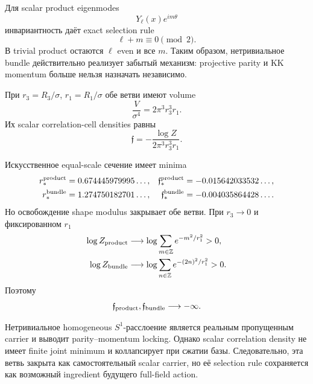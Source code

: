 Для scalar product eigenmodes
\begin{equation}
 Y_{\ell}(x)e^{im\theta}
\end{equation}
инвариантность даёт exact selection rule
\begin{equation}
 \boxed{\ell+m\equiv0\pmod2}.
 \label{eq:bundle-parity-momentum-lock}
\end{equation}
В trivial product остаются \(\ell\) even и все \(m\). Таким образом,
нетривиальное bundle действительно реализует забытый механизм:
projective parity и KK momentum больше нельзя назначать независимо.

При \(r_3=R_3/\sigma\), \(r_1=R_1/\sigma\) обе ветви имеют volume
\begin{equation}
 \frac{V}{\sigma^4}=2\pi^3r_3^3r_1.
\end{equation}
Их scalar correlation-cell densities равны
\begin{equation}
 \mathfrak f=-\frac{\log Z}{2\pi^3r_3^3r_1}.
\end{equation}

Искусственное equal-scale сечение имеет minima
\begin{align}
 r_*^{\rm product}&=0.674445979995\ldots,
 &\mathfrak f_*^{\rm product}&=-0.015642033532\ldots,\\
 r_*^{\rm bundle}&=1.274750182701\ldots,
 &\mathfrak f_*^{\rm bundle}&=-0.004035864428\ldots.
\end{align}
Но освобождение shape modulus закрывает обе ветви. При
\(r_3\to0\) и фиксированном \(r_1\)
\begin{align}
 \log Z_{\rm product}&\longrightarrow
 \log\sum_{m\in\mathbb Z}e^{-m^2/r_1^2}>0,\\
 \log Z_{\rm bundle}&\longrightarrow
 \log\sum_{n\in\mathbb Z}e^{-(2n)^2/r_1^2}>0.
\end{align}
Поэтому
\begin{equation}
 \mathfrak f_{\rm product},\mathfrak f_{\rm bundle}
 \longrightarrow-\infty.
\end{equation}

\begin{theorem}
Нетривиальное homogeneous \(S^1\)-расслоение является реальным пропущенным
carrier и выводит parity--momentum locking. Однако scalar correlation
density не имеет finite joint minimum и коллапсирует при сжатии базы.
Следовательно, эта ветвь закрыта как самостоятельный scalar carrier, но её
selection rule сохраняется как возможный ingredient будущего full-field
action.
\end{theorem}

